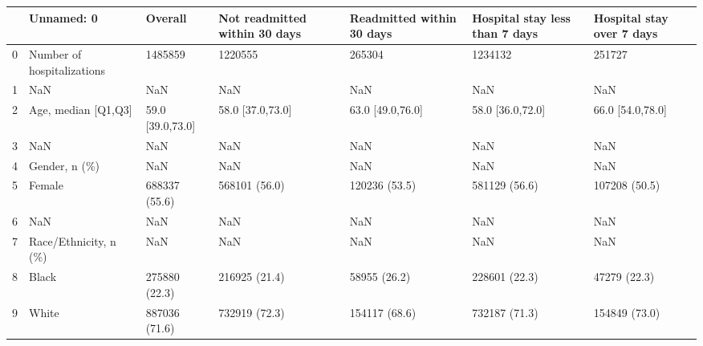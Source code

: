 \begin{tabular}{lllllll}
\toprule
{} &                                         Unnamed: 0 &            Overall & Not readmitted within 30 days & Readmitted within 30 days & Hospital stay less than 7 days & Hospital stay over 7 days \\
\midrule
0  &                         Number of hospitalizations &            1485859 &                       1220555 &                    265304 &                        1234132 &                    251727 \\
1  &                                                NaN &                NaN &                           NaN &                       NaN &                            NaN &                       NaN \\
2  &                                Age, median [Q1,Q3] &   59.0 [39.0,73.0] &              58.0 [37.0,73.0] &          63.0 [49.0,76.0] &               58.0 [36.0,72.0] &          66.0 [54.0,78.0] \\
3  &                                                NaN &                NaN &                           NaN &                       NaN &                            NaN &                       NaN \\
4  &                                      Gender, n (\%) &                NaN &                           NaN &                       NaN &                            NaN &                       NaN \\
5  &                                             Female &      688337 (55.6) &                 568101 (56.0) &             120236 (53.5) &                  581129 (56.6) &             107208 (50.5) \\
6  &                                                NaN &                NaN &                           NaN &                       NaN &                            NaN &                       NaN \\
7  &                              Race/Ethnicity, n (\%) &                NaN &                           NaN &                       NaN &                            NaN &                       NaN \\
8  &                                              Black &      275880 (22.3) &                 216925 (21.4) &              58955 (26.2) &                  228601 (22.3) &              47279 (22.3) \\
9  &                                              White &      887036 (71.6) &                 732919 (72.3) &             154117 (68.6) &                  732187 (71.3) &             154849 (73.0) \\

\end{tabular}
